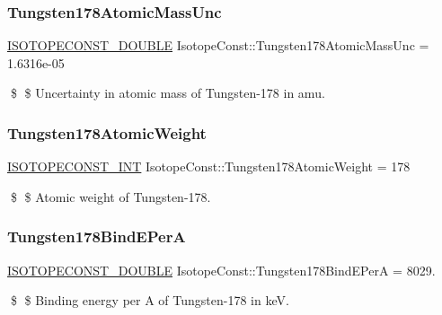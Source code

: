 \subsubsection{\texorpdfstring{Tungsten178\+Atomic\+Mass\+Unc}{Tungsten178AtomicMassUnc}}
{\footnotesize\ttfamily \mbox{\hyperlink{group___isotope_const-_macros_ga8f45a7272ce02c0b4c65c44636ed719a}{I\+S\+O\+T\+O\+P\+E\+C\+O\+N\+S\+T\+\_\+\+D\+O\+U\+B\+LE}} Isotope\+Const\+::\+Tungsten178\+Atomic\+Mass\+Unc = 1.\+6316e-\/05}

\$ \$ Uncertainty in atomic mass of Tungsten-\/178 in amu. \mbox{\label{group___isotope_const-_tungsten-_w178_gaf675c13e8b82ff3756a4a23ee96bb0d5}} 
\subsubsection{\texorpdfstring{Tungsten178\+Atomic\+Weight}{Tungsten178AtomicWeight}}
{\footnotesize\ttfamily \mbox{\hyperlink{group___isotope_const-_macros_ga5f18360b3e99483a35c32d789e62621c}{I\+S\+O\+T\+O\+P\+E\+C\+O\+N\+S\+T\+\_\+\+I\+NT}} Isotope\+Const\+::\+Tungsten178\+Atomic\+Weight = 178}

\$ \$ Atomic weight of Tungsten-\/178. \mbox{\label{group___isotope_const-_tungsten-_w178_gac4849ddeaf22d18870428a8e784e3b5d}} 
\subsubsection{\texorpdfstring{Tungsten178\+Bind\+E\+PerA}{Tungsten178BindEPerA}}
{\footnotesize\ttfamily \mbox{\hyperlink{group___isotope_const-_macros_ga8f45a7272ce02c0b4c65c44636ed719a}{I\+S\+O\+T\+O\+P\+E\+C\+O\+N\+S\+T\+\_\+\+D\+O\+U\+B\+LE}} Isotope\+Const\+::\+Tungsten178\+Bind\+E\+PerA = 8029.}

\$ \$ Binding energy per A of Tungsten-\/178 in keV. \mbox{\label{group___isotope_const-_tungsten-_w178_ga11187bbb81036600c6a1a49773046e6d}} 

